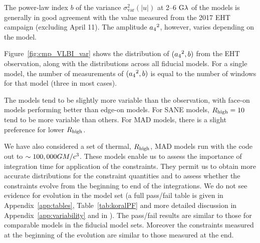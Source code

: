 
The power-law index $b$ of the variance $\sigma_\text{var}^2 (|u|)$ at 2--6$~{\rm G}\lambda$ of the models is generally in good agreement with the value measured  from the 2017 EHT campaign (excluding April 11). The amplitude ${a_4}^2$, however, varies depending on the model.

Figure~\ref{fig:cmp_VLBI_var} shows the distribution of $({a_4}^2, b)$ from the EHT observation, along with the distributions across all fiducial models. For a single model, the number of measurements of $({a_4}^2, b)$ is equal to the number of windows for that model (three in most cases). 



The models tend to be slightly more variable than the observation, with face-on models performing better than edge-on models. For SANE models, $R_\mathrm{high} = 10$ tend to be more variable than others. For MAD models, there is a slight preference for lower $R_\mathrm{high}$.

We have also considered a set of thermal, $R_\mathrm{high}$, MAD models run with the \koral code out to $\sim 100,000GM/c^3$.  These models enable us to assess the importance of integration time for application of the constraints.  They permit us to obtain more accurate distributions for the constraint quantities and to assess whether the constraints evolve from the beginning to end of the integrations. We do not see evidence for evolution in the \koral model set (a full pass/fail table is given in Appendix~\ref{app:tables}, Table~\ref{tab:koralPF} and more detailed discussion in Appendix~\ref{app:variability} and in \citet{Georgiev_2022}). The \koral pass/fail results are similar to those for comparable models in the fiducial model sets. Moreover the constraints measured at the beginning of the evolution are similar to those measured at the end.

